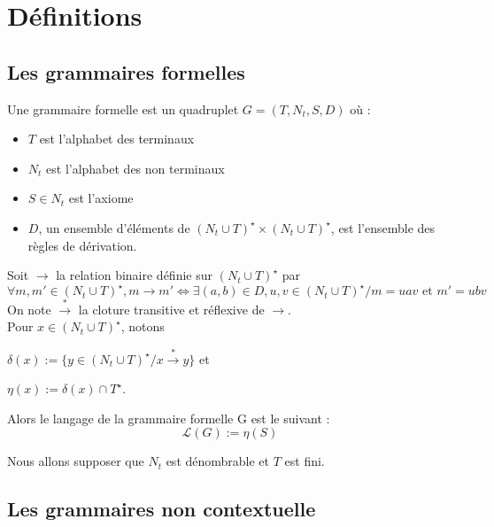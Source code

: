 \documentclass[a4paper,12pt]{article}
\title{\letitle}
\author{\leauthor}
\date{}
\begin{document}
    
\maketitle

\section{Définitions}

\subsection{Les grammaires formelles}

Une grammaire formelle est un quadruplet $G = (T,N_t,S,D)$ où :

\begin{itemize}
\item $T$ est l'alphabet des terminaux
\item $N_t$ est l'alphabet des non terminaux
\item $S \in N_t$ est l'axiome
\item $D$, un ensemble d'éléments de $(N_t \cup T)^\star \times (N_t \cup T)^\star$, est l'ensemble des règles de dérivation.
\end{itemize}

Soit $\rightarrow$ la relation binaire définie sur $(N_t \cup T)^\star$ par
\begin{equation}
\forall m,m' \in (N_t \cup T)^\star, m \rightarrow m' \iff \exists (a,b) \in D, u,v \in (N_t \cup T)^\star / m = uav \text{ et } m' = ubv
\end{equation}
On note $\overset{*}{\rightarrow}$ la cloture transitive et réflexive de $\rightarrow$.\\
Pour $x \in (N_t \cup T)^\star$, notons

$\delta(x) := \{y \in (N_t \cup T)^\star / x \overset{*}{\rightarrow} y\}$
et 

$\eta(x) := \delta(x) \cap T^\star$.

Alors le langage de la grammaire formelle  G est le suivant :
\begin{equation*}\mathcal{L} (G) := \eta(S)\end{equation*}

Nous allons supposer que $N_t$ est dénombrable et $T$ est fini.



\subsection{Les grammaires non contextuelle}
\end{document}
